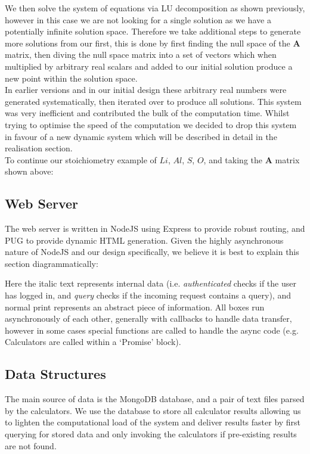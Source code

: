 We then solve the system of equations via LU decomposition as shown previously, however in this case we are not looking for a single solution as we have a potentially infinite solution space. Therefore we take additional steps to generate more solutions from our first, this is done by first finding the null space of the $\mathbf{A}$ matrix, then diving the null space matrix into a set of vectors which when multiplied by arbitrary real scalars and added to our initial solution produce a new point within the solution space. \\

In earlier versions and in our initial design these arbitrary real numbers were generated systematically, then iterated over to produce all solutions. This system was very inefficient and contributed the bulk of the computation time. Whilst trying to optimise the speed of the computation we decided to drop this system in favour of a new dynamic system which will be described in detail in the realisation section. \\

To continue our stoichiometry example of $Li$, $Al$, $S$, $O$, and taking the $\mathbf{A}$ matrix shown above:


\subsection{Web Server}
The web server is written in NodeJS using Express to provide robust routing, and PUG to provide dynamic HTML generation. Given the highly asynchronous nature of NodeJS and our design specifically, we believe it is best to explain this section diagrammatically: 



Here the italic text represents internal data (i.e. \textit{authenticated} checks if the user has logged in, and \textit{query} checks if the incoming request contains a query), and normal print represents an abstract piece of information. All boxes run asynchronously of each other, generally with callbacks to handle data transfer, however in some cases special functions are called to handle the async code (e.g. Calculators are called within a `Promise' block). 

\subsection{Data Structures}
The main source of data is the MongoDB database, and a pair of text files parsed by the calculators. We use the database to store all calculator results allowing us to lighten the computational load of the system and deliver results faster by first querying for stored data and only invoking the calculators if pre-existing results are not found.

